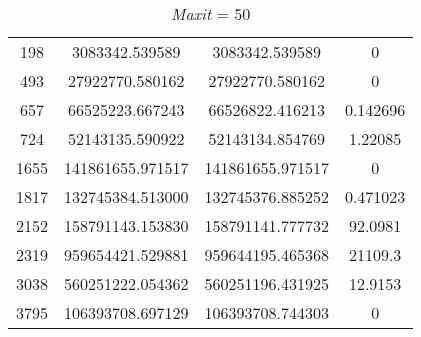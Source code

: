\documentclass[12pt,a4paper,oneside,hidelinks]{report}
\begin{document}
\begin{table}[h]
\begin{subtable}{\textwidth}
\begin{tabular}{|S[table-parse-only = true]
						|S[table-format = 9.6, table-number-alignment = center]
						|S[table-format = 9.6, table-number-alignment = center]
						|S[table-parse-only = true]|}
			\hline			
			
			198  &  3083342.539589   & 3083342.539589   & 0  \\
			493  &  27922770.580162  & 27922770.580162  & 0 \\
			657  &  66525223.667243  & 66526822.416213  & 0.142696 \\
			724  &  52143135.590922  & 52143134.854769  & 1.22085 \\
			1655 &  141861655.971517 & 141861655.971517 & 0 \\
			1817 &  132745384.513000 & 132745376.885252 & 0.471023 \\
			2152 &	158791143.153830 & 158791141.777732 & 92.0981 \\
			2319 &  959654421.529881 & 959644195.465368 & 21109.3 \\
			3038 &  560251222.054362 & 560251196.431925 & 12.9153 \\
			3795 &  106393708.697129 & 106393708.744303 & 0 \\			
			
			\hline
		\end{tabular}
		
		\vspace*{0.4 cm}
		\caption{\textit{Maxit} = 50}
	\end{subtable}%
\end{table}

\vspace*{\fill}

\vspace*{\fill}

\end{document}
